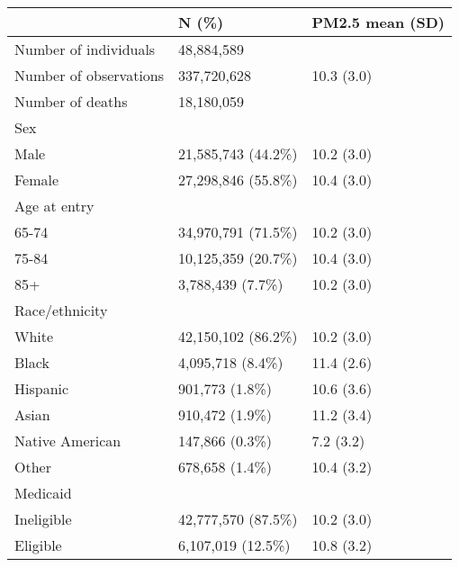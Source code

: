 \begin{table}[ht]
\centering
\begin{tabular}{lll}
  \hline
  & N (\%) & PM2.5 mean (SD) \\ 
  \hline
Number of individuals & 48,884,589 &   \\ 
  Number of observations & 337,720,628 & 10.3 (3.0) \\ 
  Number of deaths & 18,180,059 &   \\ 
  Sex &  &   \\ 
  \hspace{10pt}Male & 21,585,743 (44.2\%) & 10.2 (3.0) \\ 
  \hspace{10pt}Female & 27,298,846 (55.8\%) & 10.4 (3.0) \\ 
  Age at entry &  &   \\ 
  \hspace{10pt}65-74 & 34,970,791 (71.5\%) & 10.2 (3.0) \\ 
  \hspace{10pt}75-84 & 10,125,359 (20.7\%) & 10.4 (3.0) \\ 
  \hspace{10pt}85+ & 3,788,439 (7.7\%) & 10.2 (3.0) \\ 
  Race/ethnicity &  &   \\ 
  \hspace{10pt}White & 42,150,102 (86.2\%) & 10.2 (3.0) \\ 
  \hspace{10pt}Black & 4,095,718 (8.4\%) & 11.4 (2.6) \\ 
  \hspace{10pt}Hispanic & 901,773 (1.8\%) & 10.6 (3.6) \\ 
  \hspace{10pt}Asian & 910,472 (1.9\%) & 11.2 (3.4) \\ 
  \hspace{10pt}Native American & 147,866 (0.3\%) & 7.2 (3.2) \\ 
  \hspace{10pt}Other & 678,658 (1.4\%) & 10.4 (3.2) \\ 
  Medicaid &  &   \\ 
  \hspace{10pt}Ineligible & 42,777,570 (87.5\%) & 10.2 (3.0) \\ 
  \hspace{10pt}Eligible & 6,107,019 (12.5\%) & 10.8 (3.2) \\ 

\end{tabular}
\end{table}
